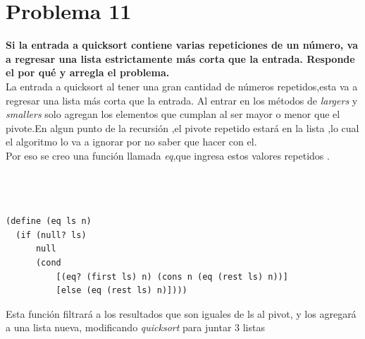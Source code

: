 \documentclass[11pt,a4paper]{report}
\begin{document}
\section*{Problema 11}
\textbf{Si la entrada a quicksort contiene varias repeticiones de un número, va a regresar una lista estrictamente más corta que la entrada. Responde el por qué y arregla el problema.}\\
La entrada a quicksort al tener una gran cantidad de números repetidos,esta va a regresar una lista más corta que la entrada.
Al entrar en los métodos de \textit{largers} y \textit{smallers} solo agregan los elementos que cumplan al ser mayor o menor que el pivote.En algun punto de la recursión ,el pivote repetido estará en la lista ,lo cual el algoritmo lo va a ignorar por no saber que hacer con el.\\
Por eso se creo una función llamada \textit{eq},que ingresa estos valores repetidos .
\\\\\\\
\begin{lstlisting}
(define (eq ls n)
  (if (null? ls)
      null
      (cond
          [(eq? (first ls) n) (cons n (eq (rest ls) n))]
          [else (eq (rest ls) n)])))
\end{lstlisting}
Esta función filtrará a los resultados que son iguales de ls al pivot, y los agregará a una lista nueva, modificando \textit{quicksort} para juntar 3 listas
\end{document}
